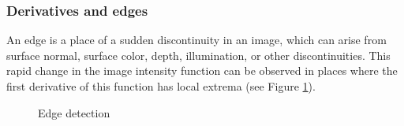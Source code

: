 \subsubsection{Derivatives and edges}
An edge is a place of a sudden discontinuity in an image, which can arise from surface normal, surface color, depth, illumination, or other discontinuities. This rapid change in the image intensity function can be observed in places where the first derivative of this function has local extrema (see Figure \ref{fig:edge-detection}).\cite{edge-detection}
\begin{figure}[H]
     \centering
     \vfill
     \vfill
     \caption{Edge detection}
     \label{fig:edge-detection}
\end{figure}

